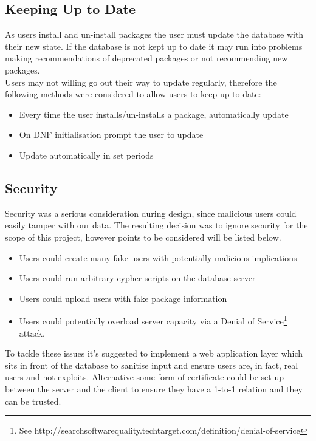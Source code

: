 \documentclass{l4proj}
\begin{document}
\subsection{Keeping Up to Date}
As users install and un-install packages the user must update the database with their new state. If the database is not kept up to date it may run into problems making recommendations of deprecated packages or not recommending new packages.\\
Users may not willing go out their way to update regularly, therefore the following methods were considered to allow users to keep up to date:
\begin{itemize}
\item Every time the user installs/un-installs a package, automatically update
\item On DNF initialisation prompt the user to update
\item Update automatically in set periods
\end{itemize}

\subsection{Security}
Security was a serious consideration during design, since malicious users could easily tamper with our data. The resulting decision was to ignore security for the scope of this project, however points to be considered will be listed below.
\begin{itemize}
\item Users could create many fake users with potentially malicious implications
\item Users could run arbitrary cypher scripts on the database server
\item Users could upload users with fake package information
\item Users could potentially overload server capacity via a Denial of Service\footnote{See http://searchsoftwarequality.techtarget.com/definition/denial-of-service} attack.
\end{itemize}
To tackle these issues it's suggested to implement a web application layer which sits in front of the database to sanitise input and ensure users are, in fact, real users and not exploits. Alternative some form of certificate could be set up between the server and the client to ensure they have a 1-to-1 relation and they can be trusted.

 
\end{document}
